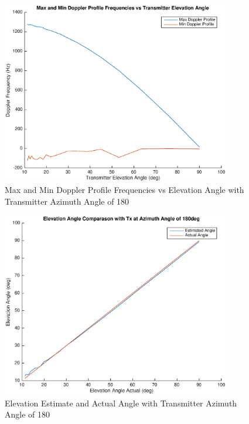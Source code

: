 \begin{figure}
	\begin{center}
		\includegraphics[width=10cm]{images/simulation/elevation_angle_max_doppler_180deg.eps}
		\caption{Max and Min Doppler Profile Frequencies vs Elevation Angle with Transmitter Azimuth Angle of 180\textdegree}
		\label{fig:envelope_180deg}
	\end{center}
\end{figure}

\begin{figure}
	\begin{center}
		\includegraphics[width=10cm]{images/results/Elevation_angle_comparason_180deg_Azimuth.eps}
		\caption{Elevation Estimate and Actual Angle with Transmitter Azimuth Angle of 180\textdegree}
		\label{fig:angle_comparason_180deg}
	\end{center}
\end{figure}

